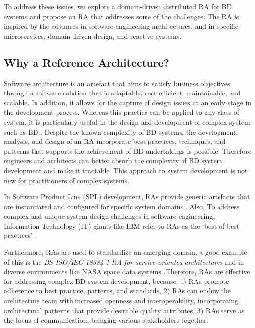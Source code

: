 \documentclass[conference]{IEEEtran}
\begin{document}
To address these issues, we explore a domain-driven distributed RA for BD systems and propose an RA that addresses some of the challenges. The RA is inspired by the advances in software engineering architectures, and in specific microservices, domain-driven design, and reactive systems. 


\subsection{Why a Reference Architecture?}
Software architecture is an artefact that aims to satisfy business objectives through a software solution that is adaptable, cost-efficient, maintainable, and scalable. In addition, it allows for the capture of design issues at an early stage in the development process. Whereas this practice can be applied to any class of system, it is particularly useful in the design and development of complex system such as BD \cite{ataei2021neomycelia}. Despite the known complexity of BD systems, the development, analysis, and design of an RA incorporate best practices, techniques, and patterns that supports the achievement of BD undertakings is possible. Therefore engineers and architects can better absorb the complexity of BD system development and make it tractable. This approach to system development is not new for practitioners of complex systems. 

In Software Product Line (SPL) development, RAs provide generic artefacts that are instantiated and configured for specific system domains \cite{Derras}. Also, To address complex and unique system design challenges in software engineering, Information Technology (IT) giants like IBM refer to RAs as the `best of best practices'  \cite{Cloutier}. 


Furthermore, RAs are used to standardize an emerging domain, a good example of this is the \emph{BS ISO/IEC 18384-1 RA for service-oriented architectures} \cite{Iso18384-1} and in diverse environments like NASA space data systems \cite{NASA}.Therefore, RAs are effective for addressing complex BD system development, because: 1) RAs promote adherence to best practice, patterns, and standards, 2) RAs can endow the architecture team with increased openness and interoperability, incorporating architectural patterns that provide desirable quality attributes, 3) RAs serve as the locus of communication, bringing various stakeholders together. 

\end{document}

